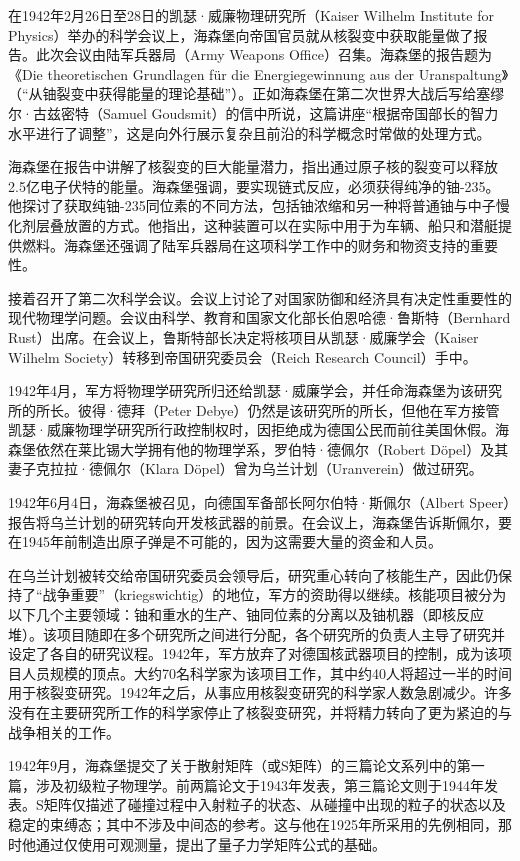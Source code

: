 在1942年2月26日至28日的凯瑟·威廉物理研究所（Kaiser Wilhelm Institute for Physics）举办的科学会议上，海森堡向帝国官员就从核裂变中获取能量做了报告。此次会议由陆军兵器局（Army Weapons Office）召集。海森堡的报告题为《Die theoretischen Grundlagen für die Energiegewinnung aus der Uranspaltung》（“从铀裂变中获得能量的理论基础”）。正如海森堡在第二次世界大战后写给塞缪尔·古兹密特（Samuel Goudsmit）的信中所说，这篇讲座“根据帝国部长的智力水平进行了调整”，这是向外行展示复杂且前沿的科学概念时常做的处理方式。

海森堡在报告中讲解了核裂变的巨大能量潜力，指出通过原子核的裂变可以释放2.5亿电子伏特的能量。海森堡强调，要实现链式反应，必须获得纯净的铀-235。他探讨了获取纯铀-235同位素的不同方法，包括铀浓缩和另一种将普通铀与中子慢化剂层叠放置的方式。他指出，这种装置可以在实际中用于为车辆、船只和潜艇提供燃料。海森堡还强调了陆军兵器局在这项科学工作中的财务和物资支持的重要性。

接着召开了第二次科学会议。会议上讨论了对国家防御和经济具有决定性重要性的现代物理学问题。会议由科学、教育和国家文化部长伯恩哈德·鲁斯特（Bernhard Rust）出席。在会议上，鲁斯特部长决定将核项目从凯瑟·威廉学会（Kaiser Wilhelm Society）转移到帝国研究委员会（Reich Research Council）手中。

1942年4月，军方将物理学研究所归还给凯瑟·威廉学会，并任命海森堡为该研究所的所长。彼得·德拜（Peter Debye）仍然是该研究所的所长，但他在军方接管凯瑟·威廉物理学研究所行政控制权时，因拒绝成为德国公民而前往美国休假。海森堡依然在莱比锡大学拥有他的物理学系，罗伯特·德佩尔（Robert Döpel）及其妻子克拉拉·德佩尔（Klara Döpel）曾为乌兰计划（Uranverein）做过研究。

1942年6月4日，海森堡被召见，向德国军备部长阿尔伯特·斯佩尔（Albert Speer）报告将乌兰计划的研究转向开发核武器的前景。在会议上，海森堡告诉斯佩尔，要在1945年前制造出原子弹是不可能的，因为这需要大量的资金和人员。

在乌兰计划被转交给帝国研究委员会领导后，研究重心转向了核能生产，因此仍保持了“战争重要”（kriegswichtig）的地位，军方的资助得以继续。核能项目被分为以下几个主要领域：铀和重水的生产、铀同位素的分离以及铀机器（即核反应堆）。该项目随即在多个研究所之间进行分配，各个研究所的负责人主导了研究并设定了各自的研究议程。1942年，军方放弃了对德国核武器项目的控制，成为该项目人员规模的顶点。大约70名科学家为该项目工作，其中约40人将超过一半的时间用于核裂变研究。1942年之后，从事应用核裂变研究的科学家人数急剧减少。许多没有在主要研究所工作的科学家停止了核裂变研究，并将精力转向了更为紧迫的与战争相关的工作。

1942年9月，海森堡提交了关于散射矩阵（或S矩阵）的三篇论文系列中的第一篇，涉及初级粒子物理学。前两篇论文于1943年发表，第三篇论文则于1944年发表。S矩阵仅描述了碰撞过程中入射粒子的状态、从碰撞中出现的粒子的状态以及稳定的束缚态；其中不涉及中间态的参考。这与他在1925年所采用的先例相同，那时他通过仅使用可观测量，提出了量子力学矩阵公式的基础。

